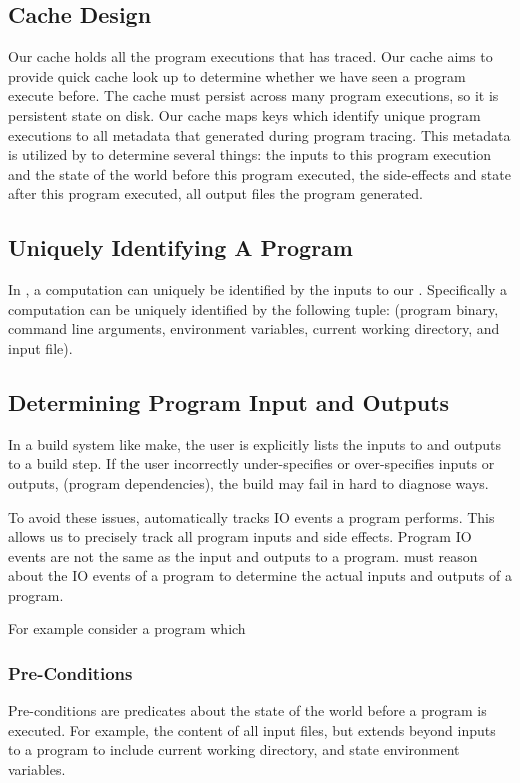 \subsection{Cache Design}
Our cache holds all the program executions that \pc has traced. Our cache aims to provide quick cache look up to determine whether we have seen a program execute before. The cache must persist across many program executions, so it is persistent state on disk. Our cache maps keys which identify unique program executions to all metadata that \pc generated during program tracing. This metadata is utilized by \pc to determine several things: the inputs to this program execution and the state of the world before this program executed, the side-effects and state after this program executed, all output files the program generated. 

\subsection{Uniquely Identifying A Program}
In \pc, a computation can uniquely be identified by the inputs to our \cacheunit. Specifically a computation can be uniquely identified by the following tuple: (program binary, command line arguments, environment variables, current working directory, and input file).


\subsection{Determining Program Input and Outputs}
In a build system like make, the user is explicitly lists the inputs to and outputs to a build step. If the user incorrectly under-specifies or over-specifies inputs or outputs, (program dependencies), the build may fail in hard to diagnose ways.

To avoid these issues, \pc automatically tracks IO events a program performs. This allows us to precisely track all program inputs and side effects. Program IO events are not the same as the input and outputs to a program. \pc must reason about the IO events of a program to determine the actual inputs and outputs of a program.

For example consider a program which 

\subsubsection{Pre-Conditions}
Pre-conditions are predicates about the state of the world before a program is executed. For example, the content of all input files, but extends beyond inputs to a program to include current working directory, and state environment variables.

